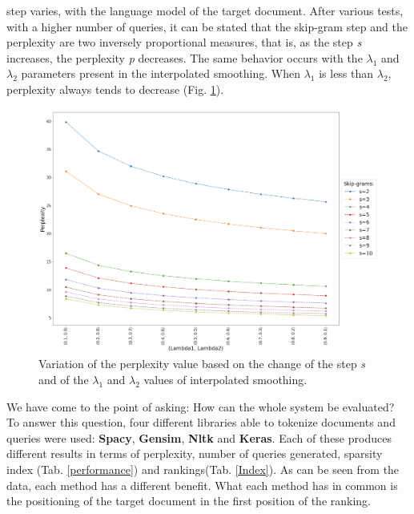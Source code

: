 step varies, with the language model of the target document. After various 
tests, with a higher number of queries, it can be stated that the skip-gram 
step and the perplexity are two inversely proportional measures, that is, as 
the step \emph{s} increases, the perplexity \emph{p} decreases. The same behavior occurs 
with the $\lambda_1$ and $\lambda_2$ parameters present in the interpolated smoothing. When  
$\lambda_1$ is less than  $\lambda_2$, perplexity always tends to decrease (Fig. \ref{perplexity}). 
\begin{figure}[h!]
    \centering
    \includegraphics[width =0.8\linewidth]{images/perplexity.png}
    \centering
    \caption{Variation of the perplexity value based on the change of the step \emph{s} and of the $\lambda_1$ and $\lambda_2$ values of interpolated smoothing.}
    \label{perplexity}
\end{figure}
We have come 
to the point of asking: How can the whole system be evaluated? To answer 
this question, four different libraries able to tokenize documents and queries 
were used: {\bfseries{Spacy}}, {\bfseries{Gensim}}, {\bfseries{Nltk}} and {\bfseries{Keras}}. Each of these produces different 
results in terms of perplexity, number of queries generated, sparsity index 
(Tab. \ref{performance}) and rankings(Tab. \ref{Index}). As can be seen from the data, each method has a different 
benefit. What each method has in common is the positioning of the target 
document in the first position of the ranking.
